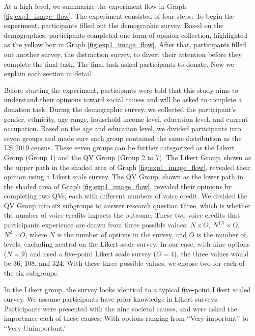 At a high level, 
we summarize the experiment flow 
in Graph \ref{fig:exp1_image_flow}.
The experiment consisted of four steps:
To begin the experiment, 
participants filled out the demographic survey.
Based on the demographics,
participants completed one form of opinion collection,
highlighted as the yellow box
in Graph \ref{fig:exp1_image_flow}.
After that, 
participants filled out another survey,
the distraction survey,
to divert their attention before they complete the final task.
The final task asked participants to donate.
Now we explain each section in detail.

Before starting the experiment,
participants were told that 
this study aims to understand their opinions 
toward social causes and will be asked to complete a donation task.
During the demographic survey, 
we collected the participant's gender, ethnicity, age range, household income level, 
education level, and current occupation.
Based on the age and education level,
we divided participants into seven groups
and made sure each group contained the same distribution
as the US 2019 census.
These seven groups can be further categorized as
the Likert Group (Group 1) and the QV Group (Group 2 to 7).
The Likert Group, shown as the upper path in the shaded area of Graph \ref{fig:exp1_image_flow}, 
revealed their opinion using a Likert scale survey.
The QV Group, shown as the lower path in the shaded area of Graph \ref{fig:exp1_image_flow}, 
revealed their opinions by completing two QVs, each with different numbers of voice credit.
We divided the QV Group into six subgroups
to answer research question three, 
which is whether the number of voice credits impacts the outcome.
These two voice credits that participants experience 
are drawn from three possible values: $N \times O$, $N^1.5 \times O$, $N^2 \times O$, 
where $N$ is the number of options in the survey, 
and $O$ is the number of levels, 
excluding neutral on the Likert scale survey. %
In our case, with nine options ($N=9$) and
used a five-point Likert scale survey ($O=4$), 
the three values would be $36$, $108$, and $324$.
With these three possible values, 
we choose two for each of the six subgroups.

In the Likert group, 
the survey looks identical to a typical five-point Likert scaled survey.
We assume participants have prior knowledge in Likert surveys.
Participants were presented with the nine societal causes, 
and were asked the importance each of these causes: 
With options ranging from ``Very important'' to ``Very Unimportant.''

